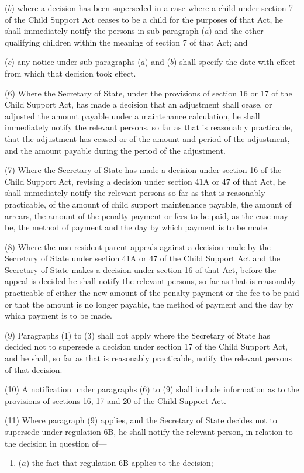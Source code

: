\documentclass[12pt,a4paper]{article}
\begin{document}
{\begin{enumerate}
($b$) where a decision has been superseded in a case where a child under section 7 of the Child Support Act ceases to be a child for the purposes of that Act, he shall immediately notify the persons in sub-paragraph ($a$)  and the other qualifying children within the meaning of section 7 of that Act; and

($c$) any notice under sub-paragraphs ($a$)  and ($b$)  shall specify the date with effect from which that decision took effect.
\end{enumerate}

(6) Where the Secretary of State, under the provisions of section 16 or 17 of the Child Support Act, has made a decision that an adjustment shall cease, or adjusted the amount payable under a maintenance calculation, he shall immediately notify the relevant persons, so far as that is reasonably practicable, that the adjustment has ceased or of the amount and period of the adjustment, and the amount payable during the period of the adjustment.

(7) Where the Secretary of State has made a decision under section 16 of the Child Support Act, revising a decision under section 41A or 47 of that Act, he shall immediately notify the relevant persons so far as that is reasonably practicable, of the amount of child support maintenance payable, the amount of arrears, the amount of the penalty payment or fees to be paid, as the case may be, the method of payment and the day by which payment is to be made.

(8) Where the non-resident parent appeals against a decision made by the Secretary of State under section 41A or 47 of the Child Support Act and the Secretary of State makes a decision under section 16 of that Act, before the appeal is decided he shall notify the relevant persons, so far as that is reasonably practicable of either the new amount of the penalty payment or the fee to be paid or that the amount is no longer payable, the method of payment and the day by which payment is to be made.

(9) Paragraphs (1) to (3) shall not apply where the Secretary of State has decided not to supersede a decision under section 17 of the Child Support Act, and he shall, so far as that is reasonably practicable, notify the relevant persons of that decision.

(10) A notification under paragraphs (6) to (9) shall include information as to the provisions of sections 16, 17 and 20 of the Child Support Act.

(11) Where paragraph (9) applies, and the Secretary of State decides not to supersede under regulation 6B, he shall notify the relevant person, in relation to the decision in question of—
\begin{enumerate}\item[]
($a$) the fact that regulation 6B applies to the decision;


\end{enumerate}}
\end{document}

